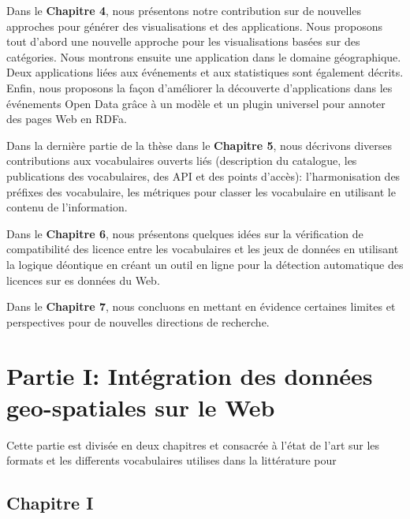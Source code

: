 \documentclass[a4paper,11pt,twoside]{report}
\begin{document}
  Dans le \textbf{Chapitre 4}, nous présentons notre contribution sur de nouvelles approches pour générer des visualisations et des applications. Nous proposons tout d'abord une nouvelle approche pour les visualisations basées sur des catégories. Nous montrons ensuite une application dans le domaine géographique. Deux applications liées aux événements et aux statistiques sont également décrits. Enfin, nous proposons la façon d'améliorer la découverte d'applications dans les événements Open Data grâce à un modèle et un plugin universel pour annoter des pages Web en RDFa.


Dans la dernière partie de la thèse dans le \textbf{Chapitre 5}, nous décrivons diverses contributions aux vocabulaires ouverts liés (description du catalogue, les publications des vocabulaires, des API et des points d'accès): l'harmonisation des préfixes des vocabulaire, les métriques pour classer les vocabulaire  en utilisant le contenu de l'information. 

Dans le \textbf{Chapitre 6}, nous présentons quelques idées sur la vérification de compatibilité des licence entre les vocabulaires et les jeux de données en utilisant la logique déontique en créant un outil en ligne pour la détection automatique des licences sur es données du Web.

Dans le \textbf{Chapitre 7}, nous concluons en mettant en évidence certaines limites et perspectives pour de nouvelles directions de recherche.





\chapter*{Partie I: Intégration des données geo-spatiales sur le Web}

Cette partie est divisée en deux chapitres et consacrée à l'état de l'art sur les formats et les differents vocabulaires utilises dans la littérature pour  

\section*{Chapitre I}
\end{document}
